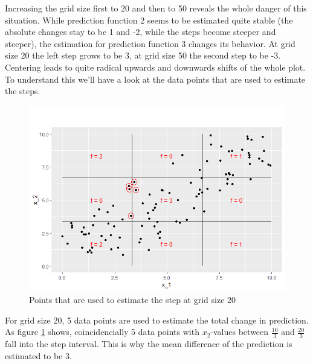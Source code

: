 \documentclass[
]{krantz}
\begin{document}
Increasing the grid size first to 20 and then to 50 reveals the whole danger of this situation. While prediction function 2 seems to be estimated quite stable (the absolute changes stay to be 1 and -2, while the steps become steeper and steeper), the estimation for prediction function 3 changes its behavior. At grid size 20 the left step grows to be 3, at grid size 50 the second step to be -3. Centering leads to quite radical upwards and downwards shifts of the whole plot.
To understand this we'll have a look at the data points that are used to estimate the steps.

\begin{figure}
\includegraphics[width=1\linewidth]{images/ALE_2_pwc_example5_critical_points2_} \caption{Points that are used to estimate the step at grid size 20}\label{fig:ALE2pwcexample5criticalpoints2}
\end{figure}



For grid size 20, 5 data points are used to estimate the total change in prediction. As figure \ref{fig:ALE2pwcexample5criticalpoints2} shows, coincidencially 5 data points with \(x_2\)-values between \(\frac{10}{3}\) and \(\frac{20}{3}\) fall into the step interval. This is why the mean difference of the prediction is estimated to be 3.
\end{document}
